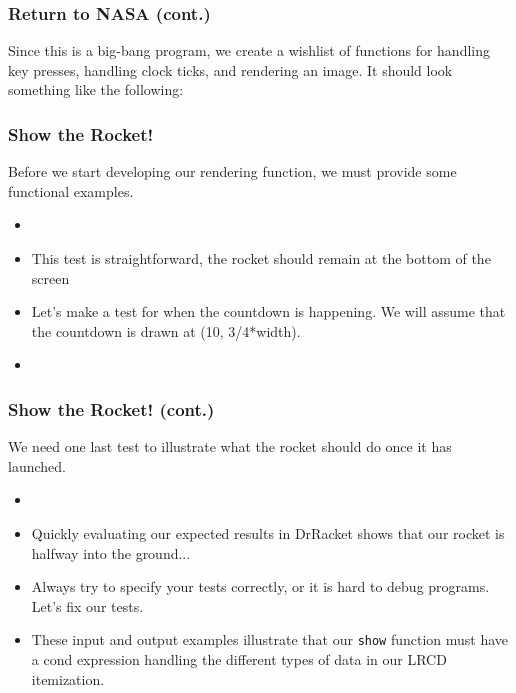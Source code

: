 \documentclass{beamer}
\begin{document}
\begin{frame}
  \frametitle{Return to NASA (cont.)}
  Since this is a big-bang program, we create a wishlist of functions for
  handling key presses, handling clock ticks, and rendering an image. It should
  look something like the following:
  \pause
 \rocketWish    
\end{frame}



\begin{frame}
  \frametitle{Show the Rocket!}
  Before we start developing our rendering function, we must provide some
  functional examples.
  \begin{itemize}
  \item<2-> \showTestOne
  \item<3-> This test is straightforward, the rocket should remain at the
    bottom of the screen
  \item<4-> Let's make a test for when the countdown is happening. We will
    assume that the countdown is drawn at (10, 3/4*width).
  \item<5-> \showTestTwo
  \end{itemize}
\end{frame}

\begin{frame}
  \frametitle{Show the Rocket! (cont.)}
  We need one last test to illustrate what the rocket should do once
  it has launched.
  \begin{itemize}
  \item<2-> \showTestThree
  \item<3-> Quickly evaluating our expected results in DrRacket
    shows that our rocket is halfway into the ground...
  \item<4-> Always try to specify your tests correctly, or it
    is hard to debug programs. Let's fix our tests.
  \item<5-> These input and output examples illustrate that our
    \texttt{show} function must have a cond expression
    handling the different types of data in our LRCD itemization.
  \end{itemize}
\end{frame}
\end{document}
